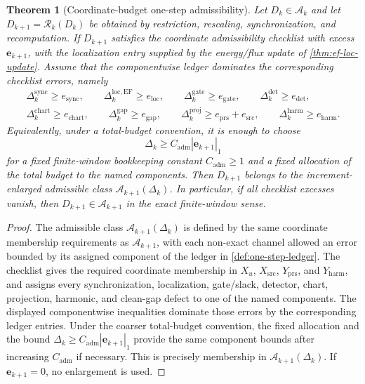 \documentclass[11pt]{article}
\numberwithin{equation}{section}
\theoremstyle{plain}
\newtheorem{theorem}{Theorem}[section]
\theoremstyle{definition}
\theoremstyle{remark}
\newcommand{\prs}{\mathrm{prs}}
\newcommand{\harm}{\mathrm{harm}}
\newcommand{\proj}{\mathrm{proj}}
\newcommand{\sync}{\mathrm{sync}}
\newcommand{\gate}{\mathrm{gate}}
\newcommand{\detc}{\mathrm{det}}
\newcommand{\chart}{\mathrm{chart}}
\newcommand{\locerr}{\mathrm{loc}}
\newcommand{\gap}{\mathrm{gap}}
\newcommand{\EF}{\mathrm{EF}}
\begin{document}
\begin{theorem}[Coordinate-budget one-step admissibility]\label{thm:coord-adm}
Let \(D_k\in\mathcal A_k\) and let \(D_{k+1}=\mathcal R_k(D_k)\) be
obtained by restriction, rescaling, synchronization, and recomputation.  If
\(D_{k+1}\) satisfies the coordinate admissibility checklist with excess
\(\mathbf e_{k+1}\), with the localization entry supplied by the
energy/flux update of \cref{thm:ef-loc-update}.  Assume that the componentwise
ledger dominates the corresponding checklist errors, namely
\[
\begin{gathered}
  \Delta_k^{\sync}\ge e_{\sync},\qquad
  \Delta_k^{\mathrm{loc},\EF}\ge e_{\locerr},\qquad
  \Delta_k^{\gate}\ge e_{\gate},\qquad
  \Delta_k^{\detc}\ge e_{\detc},\\
  \Delta_k^{\chart}\ge e_{\mathrm{chart}},
  \qquad
  \Delta_k^{\gap}\ge e_{\gap},
  \qquad
  \Delta_k^{\proj}\ge e_{\prs}+e_{\mathrm{src}},
  \qquad
  \Delta_k^{\harm}\ge e_{\harm}.
\end{gathered}
\]
Equivalently, under a total-budget convention, it is enough to choose
\[
  \Delta_k\ge C_{\mathrm{adm}}|\mathbf e_{k+1}|_1
\]
for a fixed finite-window bookkeeping constant \(C_{\mathrm{adm}}\ge1\) and a
fixed allocation of the total budget to the named components.  Then
\(D_{k+1}\) belongs to the increment-enlarged admissible class
\(\mathcal A_{k+1}(\Delta_k)\).  In particular, if all checklist excesses
vanish, then \(D_{k+1}\in\mathcal A_{k+1}\) in the exact finite-window
sense.
\end{theorem}

\begin{proof}
The admissible class \(\mathcal A_{k+1}(\Delta_k)\) is defined by the same
coordinate membership requirements as \(\mathcal A_{k+1}\), with each
non-exact channel allowed an error bounded by its assigned component of the
ledger in \cref{def:one-step-ledger}.  The checklist gives the required
coordinate membership in \(X_u\), \(X_{\mathrm{src}}\), \(Y_{\prs}\), and
\(Y_{\harm}\), and assigns every synchronization, localization, gate/slack,
detector, chart, projection, harmonic, and clean-gap defect to one of the
named components.  The displayed componentwise inequalities dominate those
errors by the corresponding ledger entries.  Under the coarser total-budget
convention, the fixed allocation and the bound
\(\Delta_k\ge C_{\mathrm{adm}}|\mathbf e_{k+1}|_1\) provide the same component
bounds after increasing \(C_{\mathrm{adm}}\) if necessary.  This is precisely
membership in \(\mathcal A_{k+1}(\Delta_k)\).  If
\(\mathbf e_{k+1}=0\), no enlargement is used.
\end{proof}
\end{document}
